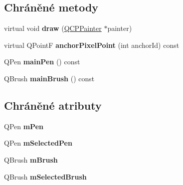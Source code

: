 \subsection*{Chráněné metody}
\begin{DoxyCompactItemize}
\item 
\hypertarget{classQCPItemEllipse_afe97ec827adb05f000fe007783faae3c}{}virtual void {\bfseries draw} (\hyperlink{classQCPPainter}{Q\+C\+P\+Painter} $\ast$painter)\label{classQCPItemEllipse_afe97ec827adb05f000fe007783faae3c}

\item 
\hypertarget{classQCPItemEllipse_ad3c607304dba081e2f778b6a81b903bb}{}virtual Q\+Point\+F {\bfseries anchor\+Pixel\+Point} (int anchor\+Id) const \label{classQCPItemEllipse_ad3c607304dba081e2f778b6a81b903bb}

\item 
\hypertarget{classQCPItemEllipse_afc78d49ed5ffa886bccf18f297f83d30}{}Q\+Pen {\bfseries main\+Pen} () const \label{classQCPItemEllipse_afc78d49ed5ffa886bccf18f297f83d30}

\item 
\hypertarget{classQCPItemEllipse_a2a9757204877c9d0fd07adfb26d6b1d8}{}Q\+Brush {\bfseries main\+Brush} () const \label{classQCPItemEllipse_a2a9757204877c9d0fd07adfb26d6b1d8}

\end{DoxyCompactItemize}
\subsection*{Chráněné atributy}
\begin{DoxyCompactItemize}
\item 
\hypertarget{classQCPItemEllipse_a16ad9389acf028a7e4ac8fd7a550b2e4}{}Q\+Pen {\bfseries m\+Pen}\label{classQCPItemEllipse_a16ad9389acf028a7e4ac8fd7a550b2e4}

\item 
\hypertarget{classQCPItemEllipse_a57b047abfce6f1a84ed46ca668c90e21}{}Q\+Pen {\bfseries m\+Selected\+Pen}\label{classQCPItemEllipse_a57b047abfce6f1a84ed46ca668c90e21}

\item 
\hypertarget{classQCPItemEllipse_a6fa59478cd3ad1b10e6c1f6cedc84bd6}{}Q\+Brush {\bfseries m\+Brush}\label{classQCPItemEllipse_a6fa59478cd3ad1b10e6c1f6cedc84bd6}

\item 
\hypertarget{classQCPItemEllipse_a2e49d5547478aa36910ed8a2dcc8a5c0}{}Q\+Brush {\bfseries m\+Selected\+Brush}\label{classQCPItemEllipse_a2e49d5547478aa36910ed8a2dcc8a5c0}

\end{DoxyCompactItemize}
